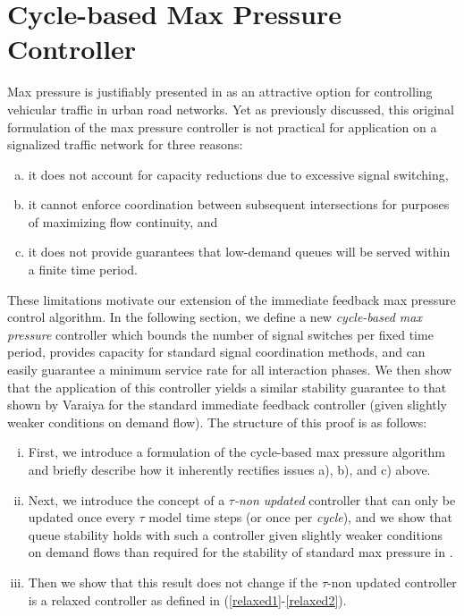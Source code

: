 \section{Cycle-based Max Pressure Controller} 




 



Max pressure is justifiably presented in \cite{MaxPressureStochastic} as an attractive option for controlling vehicular traffic in urban road networks. Yet as previously discussed, this original formulation of the max pressure controller is not practical for application on a signalized traffic network for three reasons:
\begin{enumerate}[a)]
\item it does not account for capacity reductions due to excessive signal switching, 
\item it cannot enforce coordination between subsequent intersections for purposes of maximizing flow continuity, and
\item it does not provide guarantees that low-demand queues will be served within a finite time period. 
\end{enumerate} 
These limitations motivate our extension of the immediate feedback max pressure control algorithm. In the following section, we define a new \emph{cycle-based max pressure} controller which bounds the number of signal switches per fixed time period, provides capacity for standard signal coordination methods, and can easily guarantee a minimum service rate for all interaction phases. We then show that the application of this controller yields a similar stability guarantee to that shown by Varaiya for the standard immediate feedback controller (given slightly weaker conditions on demand flow). The structure of this proof is as follows: 
\begin{enumerate}[i.]
\item First, we introduce a formulation of the cycle-based max pressure algorithm and briefly describe how it inherently rectifies issues a), b), and c) above. 
\item Next, we introduce the concept of a \emph{$\tau$-non updated} controller that can only be updated once every $\tau$ model time steps (or once per \emph{cycle}), and we show that queue stability holds with such a controller given slightly weaker conditions on demand flows than required for the stability of standard max pressure in \cite{MaxPressureStochastic}. 
\item Then we show that this result does not change if the $\tau$-non updated controller is a relaxed controller as defined in (\ref{relaxed1}-\ref{relaxed2}). 
\end{enumerate}
